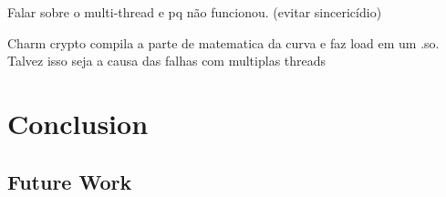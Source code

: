 \documentclass[cic,tc,english]{iiufrgs}
\begin{document}
        Falar sobre o multi-thread e pq não funcionou. (evitar sincericídio)

        Charm crypto compila a parte de matematica da curva e faz load em um .so. Talvez isso seja a causa das falhas com multiplas threads


\chapter{Conclusion}
    \label{chap:conclusion}

    \section{Future Work}
        \label{sec:futurework}






\end{document}
